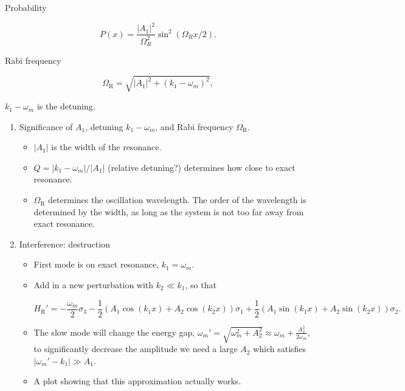 \documentclass[%
preprint,
 amsmath,amssymb,
 aps,
]{revtex4-1}
\begin{document}
Probability

\begin{equation}
P(x) = \frac{\lvert A_1 \rvert^2}{ \Omega_R^2 }  \sin^2 \left( \Omega_R x/2 \right).
\end{equation}

Rabi frequency

\begin{equation}
\Omega_{\mathrm R} = \sqrt{ \lvert A_1 \rvert^2 + (k_1 - \omega_m)^2 },
\end{equation}

$k_1 - \omega_m$ is the detuning.




\begin{enumerate}
    \item Significance of $A_1$, detuning $k_1 - \omega_m$, and Rabi frequency $\Omega_{\mathrm R}$.
        \begin{itemize}
            \item $\lvert A_1 \rvert$ is the width of the resonance.
            \item $Q = \lvert k_1 - \omega_m \rvert/\lvert A_1 \rvert$ (relative detuning?) determines how close to exact resonance.
            \item $\Omega_{\mathrm R}$ determines the oscillation wavelength. The order of the wavelength is determined by the width, as long as the system is not too far away from exact resonance.
        \end{itemize}
    \item Interference: destruction
        \begin{itemize}
            \item First mode is on exact resonance,  $k_1 = \omega_m$.
            \item Add in a new perturbation with $k_2\ll k_1$, so that
            
            \begin{equation}
            H_{\mathrm R}' = -\frac{\omega_m}{2} \sigma_3 - \frac{1}{2}( A_1 \cos(k_1 x) + A_2 \cos(k_2 x)) \sigma_1 + \frac{1}{2} ( A_1 \sin(k_1 x) + A_2 \sin(k_2 x)   ) \sigma_2.
            \end{equation}
            
            \item The slow mode will change the energy gap, $\omega_m' = \sqrt{\omega_m^2 + A_2^2} \approx \omega_m + \frac{A_2^2}{2\omega_m}$, to significantly decrease the amplitude we need a large $A_2$ which satisfies $\lvert \omega_m' - k_1 \rvert \gg A_1$.
            \item A plot showing that this approximation actually works.
        \end{itemize}
\end{enumerate}
\end{document}
